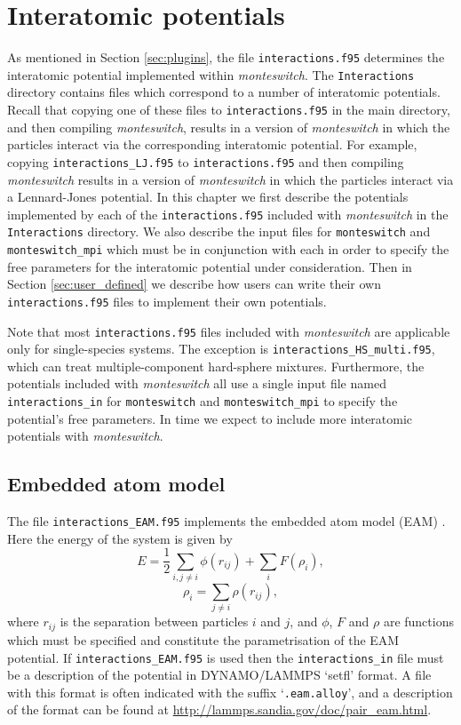 \documentclass{report}
\begin{document}
\chapter{Interatomic potentials}\label{chapter:interactions}
As mentioned in Section \ref{sec:plugins}, the file \texttt{interactions.f95} determines the interatomic potential implemented within
\emph{monteswitch}. The \texttt{Interactions} directory contains files which correspond to a number of interatomic potentials. Recall that
copying one of these files to \texttt{interactions.f95} in the main directory, and then compiling \emph{monteswitch}, results in a version 
of \emph{monteswitch} in which the particles interact via the corresponding interatomic potential. 
For example, copying \texttt{interactions\_LJ.f95} to \texttt{interactions.f95} and then compiling \emph{monteswitch} results in a version 
of \emph{monteswitch} in which the particles interact via a Lennard-Jones potential. 
In this chapter we first describe the potentials implemented by each of the \texttt{interactions.f95} included with \emph{monteswitch} in the
\texttt{Interactions} directory. We also describe the input files for \texttt{monteswitch} and \texttt{monteswitch\_mpi} which must be
in conjunction with each in order to specify the free parameters for the interatomic potential under consideration.
Then in Section \ref{sec:user_defined} we describe how users can write their own \texttt{interactions.f95} files to implement their own potentials.

Note that most \texttt{interactions.f95} files included with \emph{monteswitch} are applicable only for single-species systems. The exception is 
\texttt{interactions\_HS\_multi.f95}, which can treat multiple-component hard-sphere mixtures.
Furthermore, the potentials included with \emph{monteswitch} all use a single input file named \texttt{interactions\_in} for \texttt{monteswitch} 
and \texttt{monteswitch\_mpi} to specify the potential's free parameters. In time we expect to include more interatomic potentials with \emph{monteswitch}. 

\section{Embedded atom model}\label{sec:EAM}
The file \texttt{interactions\_EAM.f95} implements the embedded atom model (EAM) \cite{Daw_1984}. Here the energy of the system 
is given by
\begin{equation}
E = \frac{1}{2}\sum_{i,j\neq i}\phi(r_{ij}) + \sum_iF(\rho_i),
\end{equation}
\begin{equation}
\rho_i=\sum_{j\neq i}\rho(r_{ij}),
\end{equation}
where $r_{ij}$ is the separation between particles $i$ and $j$, and $\phi$, $F$ and $\rho$ are functions which must be specified
and constitute the parametrisation of the EAM potential. If \texttt{interactions\_EAM.f95} is used then the \texttt{interactions\_in}
file must be a description of the potential in DYNAMO/LAMMPS `setfl' format. A file with this format is often indicated with the 
suffix `\texttt{.eam.alloy}', and a description of the format can be found at \url{http://lammps.sandia.gov/doc/pair\_eam.html}. 
\end{document}
